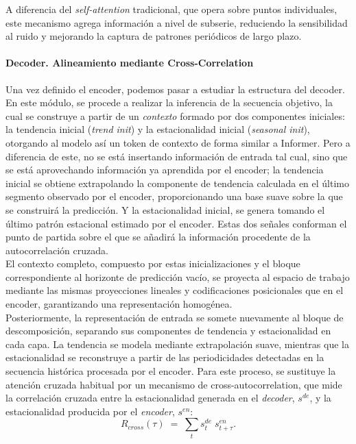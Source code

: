 A diferencia del \textit{self-attention} tradicional, que opera sobre puntos individuales, este mecanismo agrega información a nivel de subserie, reduciendo la sensibilidad al ruido y mejorando la captura de patrones periódicos de largo plazo.

\paragraph{Decoder. Alineamiento mediante Cross-Correlation} 

Una vez definido el encoder, podemos pasar a estudiar la estructura del decoder. En este módulo, se procede a realizar la inferencia de la secuencia objetivo, la cual se construye a partir de un \textit{contexto} formado por dos componentes iniciales: la tendencia inicial (\textit{trend init}) y la estacionalidad inicial (\textit{seasonal init}), otorgando al modelo así un token de contexto de forma similar a Informer. Pero a diferencia de este, no se está insertando información de entrada tal cual, sino que se está aprovechando información ya aprendida por el encoder; la tendencia inicial se obtiene extrapolando la componente de tendencia calculada en el último segmento observado por el encoder, proporcionando una base suave sobre la que se construirá la predicción. Y la estacionalidad inicial, se genera tomando el último patrón estacional estimado por el encoder. Estas dos señales conforman el punto de partida sobre el que se añadirá la información procedente de la autocorrelación cruzada.\\

El contexto completo, compuesto por estas inicializaciones y el bloque correspondiente al horizonte de predicción vacío, se proyecta al espacio de trabajo mediante las mismas proyecciones lineales y codificaciones posicionales que en el encoder, garantizando una representación homogénea.\\

Posteriormente, la representación de entrada se somete nuevamente al bloque de descomposición, separando sus componentes de tendencia y estacionalidad en cada capa. La tendencia se modela mediante extrapolación suave, mientras que la estacionalidad se reconstruye a partir de las periodicidades detectadas en la secuencia histórica procesada por el encoder. Para este proceso,  se sustituye la atención cruzada habitual por un mecanismo de cross-autocorrelation, que mide la correlación cruzada entre la estacionalidad generada en el \textit{decoder}, $s^{de}$, y la estacionalidad producida por el \textit{encoder}, $s^{en}$:
\begin{equation}
	R_{cross}(\tau) \;=\; \sum_{t} s^{de}_t \; s^{en}_{t+\tau}.
\end{equation}

